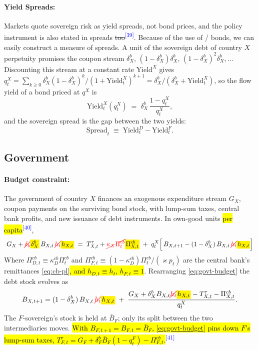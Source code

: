 \documentclass[11pt]{article}
\newcommand{\A}[1]{\hl{#1}}
\newcommand{\D}[1]{{\color{red}\st{#1}}}
\newcommand{\Am}[1]{\mathchoice
  {{\setlength{\fboxsep}{1pt}\colorbox{yellow}{$\displaystyle #1$}}}
  {{\setlength{\fboxsep}{1pt}\colorbox{yellow}{$\textstyle #1$}}}
  {{\setlength{\fboxsep}{1pt}\colorbox{yellow}{$\scriptstyle #1$}}}
  {{\setlength{\fboxsep}{1pt}\colorbox{yellow}{$\scriptscriptstyle #1$}}}}
\newcommand{\Dm}[1]{{\color{red}\cancel{#1}}}
\newcommand{\chg}[1]{\textsuperscript{\textcolor{blue}{\scriptsize[#1]}}}
\begin{document}
\paragraph{Yield Spreads:} Markets quote sovereign risk as yield spreads, not bond prices, and the policy instrument is also stated in spreads\D{ too}\chg{39}. Because of the use of \cite{Hatchondo2009}/ \cite{Chatterjee2011} bonds, we can easily construct a measure of spreads.  A unit of the sovereign debt of country $X$ perpetuity promises the coupon stream $\delta_X^b,\,(1-\delta_X^b)\delta_X^b,\,(1-\delta_X^b)^2\delta_X^b,\dots$ Discounting this stream at a constant rate $\text{Yield}^X$ gives $q_t^X=\sum_{k\ge0}\delta_X^b(1- \delta_X^b)^k/(1+\text{Yield}_t^X)^{k+1}=\delta_X^b/(\delta_X^b+\text{Yield}_t^X)$, so the flow yield of a bond priced at $q^X$ is
\begin{equation}
\text{Yield}_t^X(q_t^X)\;=\;\delta_X^b\,\frac{1-q_t^X}{q_t^X},
\label{eq:hm-yield}
\end{equation}
and the sovereign spread is the gap between the two yields:
\begin{equation}
\text{Spread}_t\;\equiv\;\text{Yield}^{D}_t-\text{Yield}^{F}_t .
\label{eq:spread-def}
\end{equation}

\subsection{Government}

\paragraph{Budget constraint:} The government of country $X$ finances an exogenous expenditure stream $G_X$, coupon payments on the surviving bond stock, with lump-sum taxes, central bank profits, and new issuance of debt instruments. In own-good units\A{ per capita}\chg{40},
\begin{equation}
\;
G_X+\Dm{\delta_b}\Am{\delta^b_X}\,B_{X,t}\,\Dm{h_t}\Am{h_{X,t}}
\;=\;T^{\tau}_{X,t} + \Dm{\kappa_X \Pi_t^{cb}}\Am{\Pi^{cb}_{X,t}}
\;+\;q^{X}_{t}\Bigl[\,B_{X,t+1}-(1-\delta_X^b)\,B_{X,t}\,\Dm{h_t}\Am{h_{X,t}}\Bigr]\;
\label{eq:govt-budget}
\end{equation}
Where $\Pi^{cb}_{D,t}\equiv\kappa^{cb}_D\Pi^{cb}_t$ and $\Pi^{cb}_{F,t}\equiv(1-\kappa^{cb}_D)\Pi^{cb}_t/(\varkappa p_t)$ are the central bank's remittances \eqref{eq:cb-pl}\A{, and $h_{D,t}\equiv h_t$, $h_{F,t}\equiv1$}. Rearranging \eqref{eq:govt-budget}  the debt stock evolves as
\begin{equation}
B_{X,t+1}=(1-\delta_X^b)\,B_{X,t}\,\Dm{h_t}\Am{h_{X,t}}
\;+\;\frac{G_X+\delta_X^b B_{X,t}\Dm{h_t}\Am{h_{X,t}}-T^{\tau}_{X,t} - \Pi_{X,t}^{cb}}{q^{X}_{t}} .
\label{eq:debt-lom}
\end{equation}
The $F$-sovereign's stock is held at $\bar B_F$; only its split between the two
intermediaries moves. \A{With $B_{F,t+1}=B_{F,t}=\bar B_F$, {\eqref{eq:govt-budget}} pins down $F$'s lump-sum taxes, $T^{\tau}_{F,t}=G_F+\delta^b_F\bar B_F(1-q^F_t)-\Pi^{cb}_{F,t}$.}\chg{41}
\end{document}

